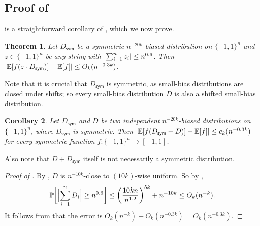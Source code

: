 \documentclass[10pt,a4paper]{article}
\newtheorem{theorem}{Theorem}%
\newtheorem{corollary}[theorem]{Corollary}
\theoremstyle{definition}
\renewcommand{\Pr}{\mathop{\mathbb{P}\/}}
\newcommand{\E}{\mathop{\mathbb{E}\/}}
\newcommand{\pmo}{\{-1,1\}}
\DeclarePairedDelimiter\abs{\lvert}{\rvert}
\def\sym{\mathsf{sym}}
\begin{document}
\subsection{Proof of }

 is a straightforward corollary of , which we now prove.

\begin{theorem} \label{thm:shifted-sym-bias-special}
  Let $D_\sym$ be a symmetric $n^{-20k}$-biased distribution on $\pmo^n$ and $z \in \pmo^n$ be any string with $\abs{\sum_{i=1}^n z_i} \le n^{0.6}$.
  Then $\abs{\E[f(z \cdot D_\sym)] - \E[f]} \le O_k(n^{-0.3k})$.
\end{theorem}

Note that it is crucial that $D_\sym$ is symmetric, as small-bias distributions are closed under shifts; so every small-bias distribution $D$ is also a shifted small-bias distribution.

\begin{corollary} \label{cor:shifted-sym-bias-special}
Let $D_\sym$ and $D$ be two independent $n^{-20k}$-biased distributions on $\pmo^n$, where $D_\sym$ is symmetric.
Then $\abs{\E[f(D_\sym + D)] - \E[f]} \le c_k(n^{-0.3k})$ for every symmetric function $f\colon\pmo^n \to [-1,1]$.
\end{corollary}

Also note that $D + D_\sym$ itself is not necessarily a symmetric distribution.

\begin{proof}[Proof of ]
  By , $D$ is $n^{-10k}$-close to $(10k)$-wise uniform.
  So by ,
  \[
    \Pr\biggl[ \abs[\Big]{\sum_{i=1}^n D_i} \ge n^{0.6} \biggr] 
    \le \left(\frac{10kn}{n^{1.2}}\right)^{5k} + n^{-10k}
    \le O_k(n^{-k}) .
  \]
  It follows from  that the error is $O_k(n^{-k}) + O_k(n^{-0.3k}) = O_k(n^{-0.3k})$.
\end{proof}
\end{document}
